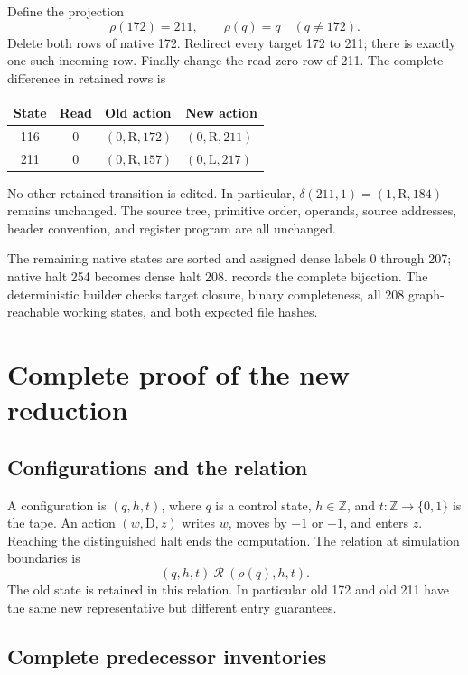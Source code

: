 \documentclass[11pt,letterpaper]{article}
\newcommand{\act}[3]{(#1,\mathrm{#2},#3)}
\newcommand{\art}[1]{\path{#1}}
\begin{document}
Define the projection
\[
\rho(172)=211,\qquad\rho(q)=q\quad(q\ne172).
\]
Delete both rows of native 172. Redirect every target 172 to 211; there is
exactly one such incoming row. Finally change the read-zero row of 211.
The complete difference in retained rows is
\begin{center}
\begin{tabular}{@{}ccll@{}}
\toprule
State & Read & Old action & New action\\
\midrule
116 & 0 & \(\act{0}{R}{172}\) & \(\act{0}{R}{211}\)\\
211 & 0 & \(\act{0}{R}{157}\) & \(\act{0}{L}{217}\)\\
\bottomrule
\end{tabular}
\end{center}
No other retained transition is edited. In particular,
\(\delta(211,1)=\act{1}{R}{184}\) remains unchanged. The source tree,
primitive order, operands, source addresses, header convention, and register
program are all unchanged.

The remaining native states are sorted and assigned dense labels
0 through 207; native halt 254 becomes dense halt 208.
\art{machine/state_map.json} records the complete bijection.
The deterministic builder checks target closure, binary completeness,
all 208 graph-reachable working states, and both expected file hashes.

\section{Complete proof of the new reduction}
\label{sec:proof}

\subsection{Configurations and the relation}

A configuration is \((q,h,t)\), where \(q\) is a control state,
\(h\in\mathbb Z\), and \(t:\mathbb Z\to\{0,1\}\) is the tape. An action
\(\act{w}{D}{z}\) writes \(w\), moves by \(-1\) or \(+1\), and enters
\(z\). Reaching the distinguished halt ends the computation.
The relation at simulation boundaries is
\[
(q,h,t)\ \mathcal R\ (\rho(q),h,t).
\]
The old state is retained in this relation. In particular old 172 and old
211 have the same new representative but different entry guarantees.

\subsection{Complete predecessor inventories}
\end{document}
